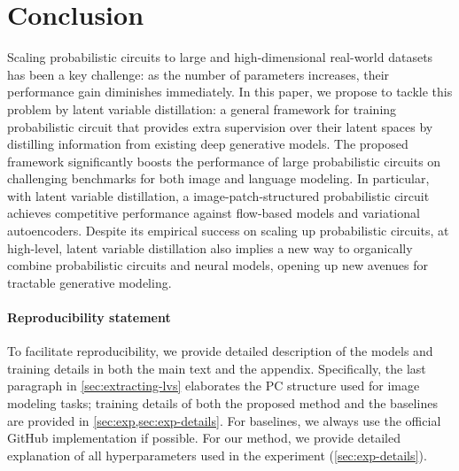 \documentclass{article} %
\begin{document}

\vspace{-0.4em}
\section{Conclusion}
\vspace{-0.4em}

Scaling probabilistic circuits to large and high-dimensional real-world datasets has been a key challenge: as the number of parameters increases, their performance gain diminishes immediately. In this paper, we propose to tackle this problem by latent variable distillation: a general framework for training probabilistic circuit that provides extra supervision over their latent spaces by distilling information from existing deep generative models. The proposed framework significantly boosts the performance of large probabilistic circuits on challenging benchmarks for both image and language modeling. In particular, with latent variable distillation, a image-patch-structured probabilistic circuit achieves competitive performance against flow-based models and variational autoencoders. Despite its empirical success on scaling up probabilistic circuits, at high-level, latent variable distillation also implies a new way to organically combine probabilistic circuits and neural models, opening up new avenues for tractable generative modeling.

\paragraph{Reproducibility statement} To facilitate reproducibility, we provide detailed description of the models and training details in both the main text and the appendix. Specifically, the last paragraph in \cref{sec:extracting-lvs} elaborates the PC structure used for image modeling tasks; training details of both the proposed method and the baselines are provided in \cref{sec:exp,sec:exp-details}. For baselines, we always use the official GitHub implementation if possible. For our method, we provide detailed explanation of all hyperparameters used in the experiment (\cref{sec:exp-details}).



\end{document}
